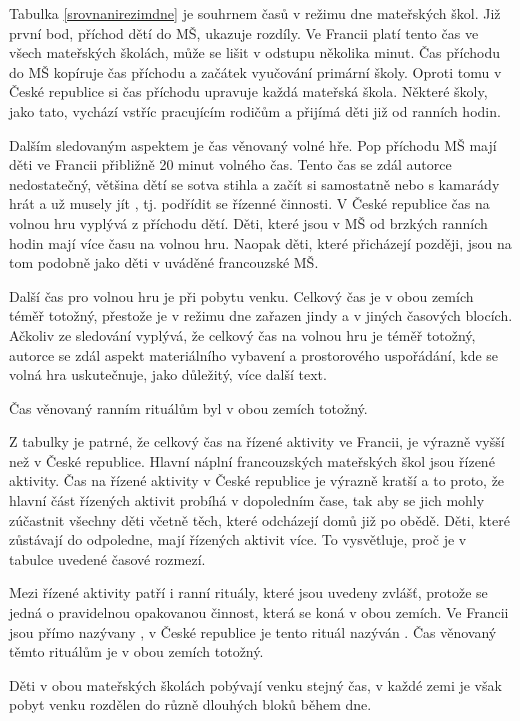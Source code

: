 	Tabulka \ref{srovnanirezimdne} je souhrnem časů v režimu dne mateřských škol. Již první bod, příchod dětí do MŠ, ukazuje rozdíly. Ve Francii platí tento čas ve všech mateřských školách, může se lišit v odstupu několika minut. Čas příchodu do MŠ kopíruje čas příchodu a začátek vyučování primární školy. Oproti tomu v České republice si čas příchodu upravuje každá mateřská škola. Některé školy, jako tato, vychází vstříc pracujícím rodičům a přijímá děti již od ranních hodin.

	Dalším sledovaným aspektem je čas věnovaný volné hře. Pop příchodu MŠ mají děti ve Francii přibližně 20 minut volného čas. Tento čas se zdál autorce nedostatečný, většina dětí se sotva stihla  a začít si samostatně nebo s kamarády hrát a už musely jít , tj. podřídit se řízenné činnosti. V České republice čas na volnou hru vyplývá z příchodu dětí. Děti, které jsou v MŠ od brzkých ranních hodin mají více času na volnou hru. Naopak děti, které přicházejí později, jsou na tom podobně jako děti v uváděné francouzské MŠ. 

	Další čas pro volnou hru je při pobytu venku. Celkový čas je v obou zemích téměř totožný, přestože je v režimu dne zařazen jindy a v jiných časových blocích. Ačkoliv ze sledování vyplývá, že celkový čas na volnou hru je téměř totožný, autorce se zdál aspekt materiálního vybavení a prostorového uspořádání, kde se volná hra uskutečnuje, jako důležitý, více další text.

	Čas věnovaný ranním rituálům byl v obou zemích totožný. 

	Z tabulky je patrné, že celkový čas na řízené aktivity ve Francii, je výrazně vyšší než v České republice. Hlavní náplní francouzských mateřských škol jsou řízené aktivity. Čas na řízené aktivity v České republice je výrazně kratší a to proto, že hlavní část řízených aktivit probíhá v dopoledním čase, tak aby se jich mohly zúčastnit všechny děti včetně těch, které odcházejí domů již po obědě. Děti, které zůstávají do odpoledne, mají řízených aktivit více. To vysvětluje, proč je v tabulce uvedené časové rozmezí.

	Mezi řízené aktivity patří i ranní rituály, které jsou uvedeny zvlášť, protože se jedná o pravidelnou opakovanou činnost, která se koná v obou zemích. Ve Francii jsou přímo nazývany , v České republice je tento rituál nazýván . Čas věnovaný těmto rituálům je v obou zemích totožný.

	Děti v obou mateřských školách pobývají venku stejný čas, v každé zemi je však pobyt venku rozdělen do různě dlouhých bloků během dne. 

